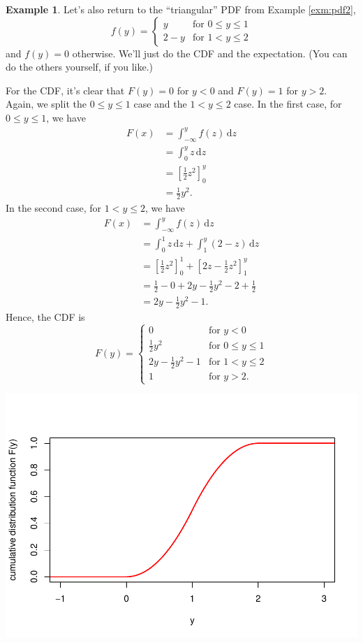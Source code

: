 \documentclass[
  a4paper,
]{book}
\theoremstyle{definition}
\theoremstyle{definition}
\newtheorem{example}{Example}[chapter]
\theoremstyle{definition}
\theoremstyle{definition}
\theoremstyle{remark}
\begin{document}
\begin{example}
Let's also return to the ``triangular'' PDF from Example \ref{exm:pdf2},
\[ f(y) = \begin{cases} y & \text{for $0 \leq y \leq 1$} \\
2-y & \text{for $1 < y \leq 2$} \end{cases} \]
and \(f(y) = 0\) otherwise. We'll just do the CDF and the expectation. (You can do the others yourself, if you like.)

For the CDF, it's clear that \(F(y) = 0\) for \(y < 0\) and \(F(y) = 1\) for \(y > 2\). Again, we split the \(0 \leq y \leq 1\) case and the \(1 < y \leq 2\) case. In the first case, for \(0 \leq y \leq 1\), we have
\begin{align*}
  F(x) &= \int_{-\infty}^y f(z) \, \mathrm dz \\
    &= \int_0^y z \, \mathrm dz \\
    &= \left[ \tfrac12 z^2 \right]_0^y \\
    &= \tfrac 12 y^2 .
\end{align*}
In the second case, for \(1 < y \leq 2\), we have
\begin{align*}
  F(x) &= \int_{-\infty}^y f(z) \, \mathrm dz \\
    &= \int_0^1 z \, \mathrm dz + \int_1^y (2 - z)\,\mathrm dz \\
    &= \left[ \tfrac12 z^2 \right]_0^1 + \left[ 2z - \tfrac12 z^2 \right]_1^y \\
    &= \tfrac 12 - 0 + 2y - \tfrac12 y^2 - 2 + \tfrac12 \\
    &= 2y - \tfrac12 y^2 - 1  .
\end{align*}
Hence, the CDF is
\[ F(y) = \begin{cases} 0 & \text{for $y < 0$} \\
            \tfrac12 y^2 & \text{for $0 \leq y \leq 1$} \\
            2y - \tfrac12 y^2 - 1  & \text{for $1 < y \leq 2$} \\
            1 & \text{for $y > 2$}. \end{cases} \]

\includegraphics{math1710_files/figure-latex/second-cdf-1.pdf}


\end{example}
\end{document}
